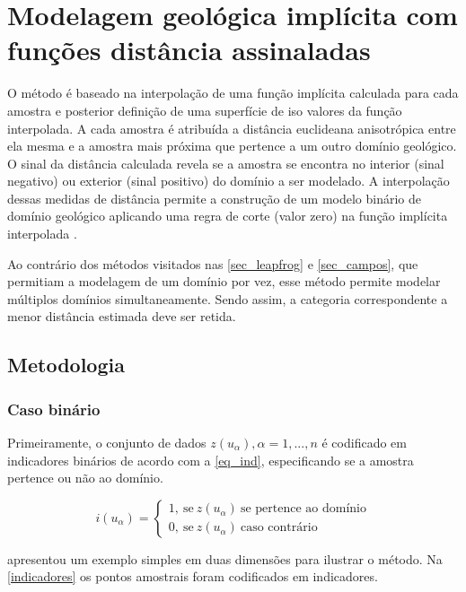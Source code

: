\chapter{Modelagem geológica implícita com funções distância assinaladas} \label{metodologia}

O método é baseado na interpolação de uma função implícita calculada para cada amostra e posterior definição de uma superfície de iso valores da função interpolada. A cada amostra é atribuída a distância euclideana anisotrópica entre ela mesma e a amostra mais próxima que pertence a um outro domínio geológico. O sinal da distância calculada revela se a amostra se encontra no interior (sinal negativo) ou exterior (sinal positivo) do domínio a ser modelado. A interpolação dessas medidas de distância permite a construção de um modelo binário de domínio geológico aplicando uma regra de corte (valor zero) na função implícita interpolada \cite{silvaanddeutschccgmodeling}. 

Ao contrário dos métodos visitados nas \autoref{sec_leapfrog} e \autoref{sec_campos}, que permitiam a modelagem de um domínio por vez, esse método permite modelar múltiplos domínios simultaneamente. Sendo assim, a categoria correspondente a menor distância estimada deve ser retida.

\section{Metodologia}\label{metodologia}

\subsection{Caso binário}\label{binario}

Primeiramente, o conjunto de dados ${z(u_\alpha),\alpha=1,...,n}$ é codificado em indicadores binários de acordo com a \autoref{eq_ind}, especificando se a amostra pertence ou não ao domínio. 

\begin{equation}
	i(u_\alpha)=\begin{cases}
	1,\:\textrm{se}\:z(u_\alpha)\:\textrm{se pertence ao domínio}\\
	0,\:\textrm{se}\:z(u_\alpha)\:\textrm{caso contrário}\end{cases}
    \label{eq_ind}
\end{equation}

 apresentou um exemplo simples em duas dimensões para ilustrar o método. Na \autoref{indicadores} os pontos amostrais foram codificados em indicadores.

